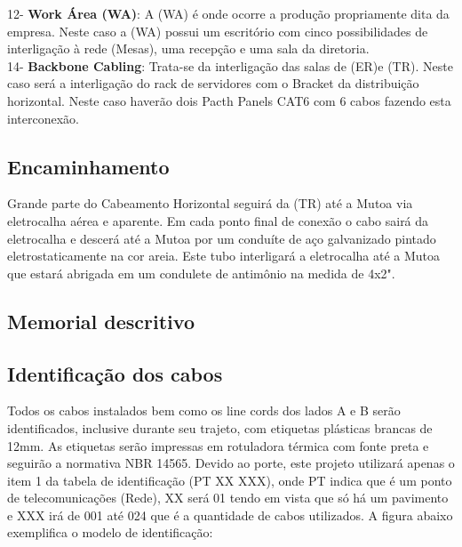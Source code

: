 \documentclass[	DIV=calc,%
							paper=a4,%
							fontsize=12pt,%
							onecolumn]{scrartcl}	 					%
\begin{document}
12- \textbf{Work Área (WA)}: A (WA) é onde ocorre a produção propriamente dita da empresa. Neste caso a (WA) possui um escritório com cinco possibilidades de interligação à rede (Mesas), uma recepção e uma sala da diretoria.\\
14- \textbf{Backbone Cabling}: Trata-se da interligação das salas de (ER)e (TR). Neste caso será a interligação do rack de servidores com o Bracket da distribuição horizontal. Neste caso haverão dois Pacth Panels CAT6 com 6 cabos fazendo esta interconexão.\\
 


\subsection{Encaminhamento}
Grande parte do Cabeamento Horizontal seguirá da (TR) até a Mutoa via eletrocalha aérea e aparente. Em cada ponto final de conexão o cabo sairá da eletrocalha e descerá até a Mutoa por um conduíte de aço galvanizado pintado eletrostaticamente na cor areia. Este tubo interligará a eletrocalha até a Mutoa que estará abrigada em um condulete de antimônio na medida de 4x2". 

\subsection{Memorial descritivo}




\subsection{Identificação dos cabos}
Todos os cabos instalados bem como os line cords dos lados A e B serão identificados, inclusive durante seu trajeto, com etiquetas plásticas brancas de 12mm. As etiquetas serão  impressas em rotuladora térmica com fonte preta e seguirão a normativa NBR 14565.
Devido ao porte, este projeto utilizará apenas o item 1 da tabela de identificação (PT XX XXX), onde PT indica que é um ponto de telecomunicações (Rede), XX será 01 tendo em vista que só há um pavimento e XXX irá de 001 até 024 que é a quantidade de cabos utilizados.
A figura abaixo exemplifica o modelo de identificação:
\end{document}
